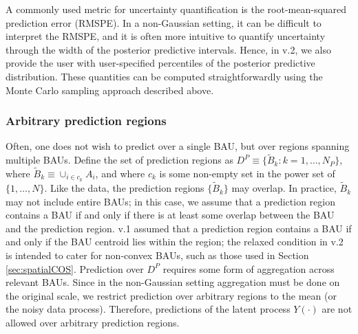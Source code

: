 \documentclass[nojss]{jss}
\newcommand{\red}[1]{\textcolor{red}{#1}}
\def\mbf#1{{%
\mathchoice%
{\hbox{\boldmath$\displaystyle{#1}$}}%
{\hbox{\boldmath$\textstyle{#1}$}}%
{\hbox{\boldmath$\scriptstyle{#1}$}}%
{\hbox{\boldmath$\scriptscriptstyle{#1}$}}%
}}
\def\vec{\mbf}
\newcommand{\ECurly}[1]{\mathbb{E}\left\{#1\right\}} %
\begin{document}
 

A commonly used metric for uncertainty quantification is the root-mean-squared prediction error (RMSPE). 
In a non-Gaussian setting, it can be difficult to interpret the RMSPE, and it is often more intuitive to quantify uncertainty through the width of the posterior predictive intervals. Hence, in  v.2, we also provide the user with user-specified percentiles of the posterior predictive distribution. 
 These quantities can be computed straightforwardly using the Monte Carlo sampling approach described above. 



\subsubsection{Arbitrary prediction regions}


Often, one does not wish to predict over a single BAU, but over regions spanning multiple BAUs.
Define the set of prediction regions as 
$D^P \equiv \{\tilde{B}_k : k = 1, \dots, N_P\}$, where $\tilde{B}_k \equiv \cup_{i\in c_k} A_i$, and where $c_k$ is some non-empty set in the power set of $\{1, \dots, N\}$. 
Like the data, the prediction regions $\{\tilde{B}_k\}$ may overlap.  
In practice, $\tilde{B}_k$  may not include entire BAUs; in this case, we assume that a prediction region contains a BAU if and only if there is at least some overlap between the BAU and the prediction region.
 v.1 assumed that a prediction region contains a BAU if and only if the BAU centroid lies within the region; the relaxed condition in  v.2 is intended to cater for non-convex BAUs, such as those used in Section \ref{sec:spatialCOS}.
Prediction over $D^P$ requires some form of aggregation across relevant BAUs.
Since in the non-Gaussian setting aggregation must be done on the original scale, we restrict prediction over arbitrary regions to the mean (or the noisy data process).  
Therefore, predictions of the latent process $Y(\cdot)$ are not allowed over arbitrary prediction regions.
\end{document}
